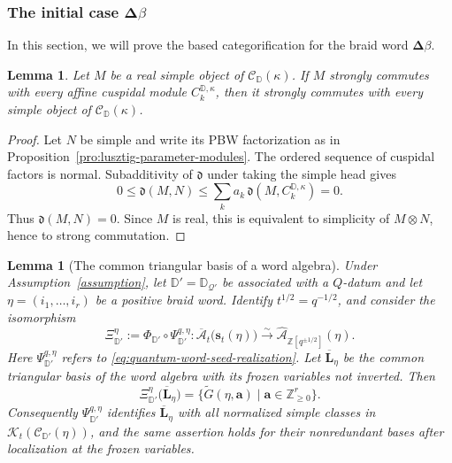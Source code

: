 \documentclass[12pt, reqno]{amsart}
\theoremstyle{plain}
\newtheorem{lemma}[theorem]{Lemma}
\theoremstyle{definition}
\numberwithin{equation}{section}
\newcommand{\ZZ}{\mathbb{Z}}
\newcommand{\DD}{\mathbb{D}}
\newcommand{\cA}{\mathcal{A}}
\begin{document}
\subsubsection{The initial case $\boldsymbol{\Delta}\beta$} In this section, we will prove the based categorification for the braid word $\boldsymbol{\Delta}\beta$.
\begin{lemma}\label{lem:commuting-with-PBW-heads}
Let \(M\) be a real simple object of \(\mathscr C_{\DD}(\kappa)\).
If \(M\) strongly commutes with every affine cuspidal module
\(C_k^{\DD,\kappa}\), then it strongly commutes with every simple
object of \(\mathscr C_\DD(\kappa)\).
\end{lemma}

\begin{proof}
Let \(N\) be simple and write its PBW factorization as in
Proposition~\ref{pro:lusztig-parameter-modules}. The ordered sequence
of cuspidal factors is normal. Subadditivity of \(\mathfrak d\) under
taking the simple head gives
\[
 0\leq\mathfrak d(M,N)
 \leq\sum_k a_k\,
       \mathfrak d(M,C_k^{\DD,\kappa})=0.
\]
Thus \(\mathfrak d(M,N)=0\). Since \(M\) is real, this is equivalent
to simplicity of \(M\otimes N\), hence to strong commutation.
\end{proof}


\begin{lemma}[The common triangular basis of a word algebra]
\label{lem:Qin-positive-braid-category-comparison}
Under Assumption~\ref{assumption}, let
\(\DD'=\DD_{\mathcal Q'}\) be associated with a \(Q\)-datum and let
\(\eta=(i_1,\ldots,i_r)\) be a positive braid word.  Identify
\(t^{1/2}=q^{-1/2}\), and consider the isomorphism
\begin{equation}\label{eq:word-bosonic-based-realization}
 \Xi_{\DD'}^\eta
 :=\Phi_{\DD'}\circ\Psi_{\DD'}^{q,\eta}\colon
 \overline{\mathcal A}_t\bigl(\mathbf s_t(\eta)\bigr)
 \xrightarrow{\sim}
 \widehat{\cA}_{\ZZ[q^{\pm1/2}]}(\eta).
\end{equation}
Here $\Psi_{\DD'}^{q,\eta}$ refers to \eqref{eq:quantum-word-seed-realization}.
Let \(\overline{\mathbf L}_\eta\) be the common triangular basis of
the word algebra with its frozen variables not inverted.  Then
\begin{equation}\label{eq:word-common-triangular-global-basis}
 \Xi_{\DD'}^\eta\bigl(\overline{\mathbf L}_\eta\bigr)
 =\{\widetilde G(\eta,\mathbf a)
       \mid\mathbf a\in\ZZ_{\geq0}^r\}.
\end{equation}
Consequently \(\Psi_{\DD'}^{q,\eta}\) identifies
\(\overline{\mathbf L}_\eta\) with all normalized simple classes
in \(\mathcal K_t(\mathscr C_{\DD'}(\eta))\), and the same assertion
holds for their nonredundant bases after localization at the frozen
variables.
\end{lemma}
\end{document}
